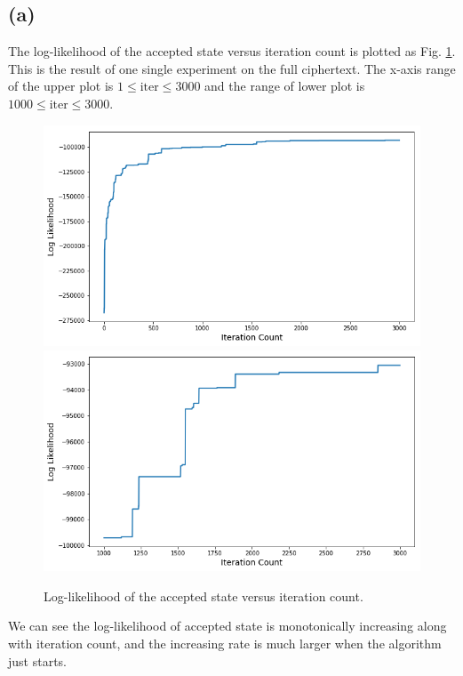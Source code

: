 \documentclass[12pt]{article}
\begin{document}
\subsection{(a)}
The log-likelihood of the accepted state versus iteration count is plotted as Fig. \ref{fig:log-likelihood}. This is the result of one single experiment on the full ciphertext. The x-axis range of the upper plot is $1\leq\text{iter}\leq3000$ and the range of lower plot is $1000\leq\text{iter}\leq3000$.
\begin{figure}[H]
	\centering
	\includegraphics[width=0.9\linewidth]{pics/log-likelihood-1.png}
	\includegraphics[width=0.9\linewidth]{pics/log-likelihood-2.png}
	\caption{Log-likelihood of the accepted state versus iteration count.}
	\label{fig:log-likelihood}
\end{figure}
We can see the log-likelihood of accepted state is monotonically increasing along with iteration count, and the increasing rate is much larger when the algorithm just starts.
\end{document}
